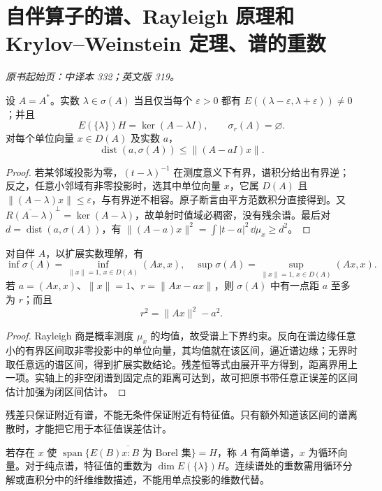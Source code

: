 \section[自伴算子的谱、Rayleigh 原理和 Krylov--Weinstein 定理、谱的重数]{自伴算子的谱、Rayleigh 原理和\\Krylov--Weinstein 定理、谱的重数}\label{sec:yosida-11-08}
\noindent\textit{原书起始页：中译本 332；英文版 319。}

\begin{theorem}[谱、原子与残差]\label{thm:y11-spectral-tests}
设 $A=A^*$。实数 $\lambda\in\sigma(A)$ 当且仅当每个 $\varepsilon>0$ 都有 $E((\lambda-\varepsilon,\lambda+\varepsilon))\ne0$；并且
\[
 E(\{\lambda\})H=\ker(A-\lambda I),\qquad \sigma_r(A)=\varnothing.
\]
对每个单位向量 $x\in D(A)$ 及实数 $a$，
\[
 \operatorname{dist}(a,\sigma(A))\le\|(A-aI)x\|.
\]
\end{theorem}
\begin{proof}
若某邻域投影为零，$(t-\lambda)^{-1}$ 在测度意义下有界，谱积分给出有界逆；反之，任意小邻域有非零投影时，选其中单位向量 $x$，它属 $D(A)$ 且 $\|(A-\lambda)x\|\le\varepsilon$，与有界逆不相容。原子断言由平方范数积分直接得到。又 $\overline{R(A-\lambda)}^\perp=\ker(A-\lambda)$，故单射时值域必稠密，没有残余谱。最后对 $d=\operatorname{dist}(a,\sigma(A))$，有 $\|(A-a)x\|^2=\int|t-a|^2\,\dd\mu_x\ge d^2$。
\end{proof}

\begin{theorem}\label{thm:y11-rayleigh}
对自伴 $A$，以扩展实数理解，有
\[
 \inf\sigma(A)=\inf_{\|x\|=1,\,x\in D(A)}(Ax,x),\quad
 \sup\sigma(A)=\sup_{\|x\|=1,\,x\in D(A)}(Ax,x).
\]
若 $a=(Ax,x)$、$\|x\|=1$、$r=\|Ax-ax\|$，则 $\sigma(A)$ 中有一点距 $a$ 至多为 $r$；而且
\[
 r^2=\|Ax\|^2-a^2.
\]
\end{theorem}
\begin{proof}
Rayleigh 商是概率测度 $\mu_x$ 的均值，故受谱上下界约束。反向在谱边缘任意小的有界区间取非零投影中的单位向量，其均值就在该区间，逼近谱边缘；无界时取任意远的谱区间，得到扩展实数结论。残差恒等式由展开平方得到，距离界用上一项。实轴上的非空闭谱到固定点的距离可达到，故可把原书带任意正误差的区间估计加强为闭区间估计。
\end{proof}

残差只保证附近有谱，不能无条件保证附近有特征值。只有额外知道该区间的谱离散时，才能把它用于本征值误差估计。

\begin{definition}[简单谱与重数]
若存在 $x$ 使 $\overline{\operatorname{span}\{E(B)x:B\text{ 为 Borel 集}\}}=H$，称 $A$ 有简单谱，$x$ 为循环向量。对于纯点谱，特征值的重数为 $\dim E(\{\lambda\})H$。连续谱处的重数需用循环分解或直积分中的纤维维数描述，不能用单点投影的维数代替。
\end{definition}

